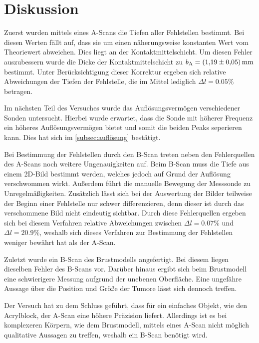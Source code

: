 \section{Diskussion}
\label{sec:Diskussion} 
Zuerst wurden mittels eines A-Scans die Tiefen aller Fehlstellen bestimmt. Bei diesen Werten fällt auf, dass sie um einen näherungsweise konstanten Wert vom Theoriewert abweichen.
Dies liegt an der Kontaktmittelschicht. Um diesen Fehler auszubessern wurde die Dicke der Kontaktmittelschicht zu $b_\text{A} = \qty{1.19 +- 0.05}{\milli\metre}$ bestimmt. 
Unter Berücksichtigung dieser Korrektur ergeben sich relative Abweichungen der Tiefen der Fehlstelle, die im Mittel lediglich $\Delta l = 0.05\%$ betragen. 

Im nächsten Teil des Versuches wurde das Auflösungsvermögen verschiedener Sonden untersucht. Hierbei wurde erwartet, dass die Sonde mit höherer Frequenz
ein höheres Auflösungsvermögen bietet und somit die beiden Peaks 
seperieren kann. Dies hat sich im \autoref{subsec:auflösung} bestätigt. 

Bei Bestimmung der Fehlstellen durch den B-Scan treten neben den Fehlerquellen des A-Scans noch weitere Ungenauigkeiten auf.
Beim B-Scan muss die Tiefe aus einem 2D-Bild bestimmt werden, welches jedoch auf Grund der Auflösung verschwommen wirkt. Außerdem führt die manuelle Bewegung der Messsonde
zu Unregelmäßigkeiten. Zusätzlich lässt sich bei der Auswertung der Bilder teilweise der Beginn einer Fehlstelle nur schwer differenzieren, denn dieser ist durch das 
verschommene Bild nicht eindeutig sichtbar. Durch diese Fehlerquellen ergeben sich bei diesem Verfahren relative 
Abweichungen zwischen $\Delta l = 0.07\%$ und $\Delta l = 20.9\%$, weshalb 
sich dieses Verfahren zur Bestimmung der Fehlstellen weniger bewährt hat als der A-Scan. 

Zuletzt wurde ein B-Scan des Brustmodells angefertigt. Bei diesem liegen dieselben Fehler des B-Scans
vor. Darüber hinaus ergibt sich beim Brustmodell eine schwierigere Messung aufgrund der unebenen Oberfläche.
Eine ungefähre Aussage über die Position und Größe der Tumore lässt sich dennoch treffen. 

Der Versuch hat zu dem Schluss geführt, dass für ein einfaches Objekt, wie den Acrylblock, 
der A-Scan eine höhere Präzision liefert. Allerdings ist es bei komplexeren Körpern, wie dem Brustmodell, mittels eines A-Scan nicht möglich qualitative Aussagen zu treffen,
weshalb ein B-Scan benötigt wird.
